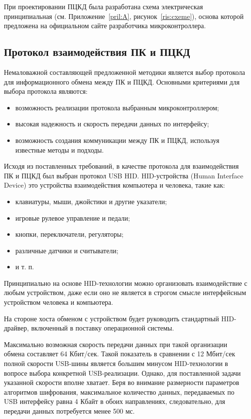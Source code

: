 При проектировании ПЦКД была разработана схема электрическая принципиальная
(см. Приложение~\ref{pril:A}, рисунок~\ref{ris:cxeme}), основа которой предложена на
официальном сайте разработчика микроконтроллера.~\cite{olimex}

\subsection{Протокол взаимодействия ПК и ПЦКД}

Немаловажной составляющей предложенной методики является выбор протокола для
информационного обмена между ПК и ПЦКД. Основными критериями для выбора
протокола являются:
\begin{itemize}
  \item возможность реализации протокола выбранным микроконтроллером;
  \item высокая
надежность и скорость передачи данных по интерфейсу;
\item возможность создания
коммуникации между ПК и ПЦКД, используя известные методы и подходы.
\end{itemize}

Исходя из поставленных требований, в качестве протокола для взаимодействия ПК и
ПЦКД был выбран протокол USB HID. HID-устройства (Human Interface Device) это
устройства взаимодействия компьютера и человека, такие как:
\begin{itemize}
  \item клавиатуры, мыши, джойстики и другие указатели;
  \item игровые
рулевое управление и педали;
\item кнопки, переключатели, регуляторы; 
\item различные датчики и считыватели;
 \item и т. п.
\end{itemize}

Принципиально на основе HID-технологии можно организовать взаимодействие с любым
устройством, даже если оно не является в строгом смысле интерфейсным устройством
человека и компьютера.

На стороне хоста обменом с устройством будет руководить стандартный
 HID-драйвер, включенный в поставку операционной системы.

Максимально возможная скорость передачи данных при такой организации обмена
составляет 64 Кбит/сек. Такой показатель в сравнении с 12 Мбит/сек полной
скорости USB-шины является большим минусом HID-технологии в вопросе выбора
конкретной USB-реализации. Однако, для поставленной задачи указанной скорости
вполне хватает. Беря во внимание размерности параметров алгоритмов шифрования,
максимальное количество данных, передаваемых по USB интерфейсу равна 4 Кбайт в
обоих направлениях, следовательно, для передачи данных потребуется менее 500 мс.

